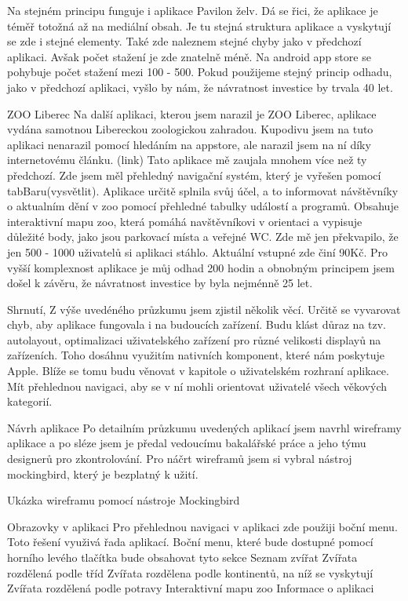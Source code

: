 \documentclass[thesis=B,czech]{FITthesis}[2012/06/26]
\begin{document}
Na stejném principu funguje i aplikace Pavilon želv. Dá se řici, že aplikace je téměř totožná až na mediální obsah. Je tu stejná struktura aplikace a vyskytují se zde i stejné elementy. Také zde naleznem stejné chyby jako v předchozí aplikaci. Avšak počet stažení je zde znatelně méně. Na android app store se pohybuje počet stažení mezi 100 - 500. Pokud použijeme stejný princip odhadu, jako v předchozí aplikaci, vyšlo by nám, že návratnost investice by trvala 40 let.

ZOO Liberec
Na další aplikaci, kterou jsem narazil je ZOO Liberec, aplikace vydána samotnou Libereckou zoologickou zahradou. Kupodivu jsem na tuto aplikaci nenarazil pomocí hledáním na appstore, ale narazil jsem na ní díky internetovému článku. (link)
Tato aplikace mě zaujala mnohem více než ty předchozí. Zde jsem měl přehledný navigační systém, který je vyřešen pomocí tabBaru(vysvětlit). Aplikace určitě splnila svůj účel, a to informovat návštěvníky o aktualním dění v zoo pomocí přehledné tabulky událostí a programů. Obsahuje interaktivní mapu zoo, která pomáhá navštěvníkovi v orientaci a vypisuje důležité body, jako jsou parkovací místa a veřejné WC.
Zde mě jen překvapilo, že jen 500 - 1000 uživatelů si aplikaci stáhlo. Aktuální vstupné zde činí 90Kč. Pro vyšší komplexnost aplikace je můj odhad 200 hodin a obnobným principem jsem došel k závěru, že návratnost investice by byla nejménně 25 let. 



Shrnutí,
Z výše uvedéného průzkumu jsem zjistil několik věcí. Určitě se vyvarovat chyb, aby aplikace fungovala i na budoucích zařízení. Budu klást důraz na tzv. autolayout, optimalizaci uživatelského zařízení pro různé velikosti displayů na zařízeních. Toho dosáhnu využitím nativních komponent, které nám poskytuje Apple. Blíže se tomu budu věnovat v kapitole o uživatelském rozhraní aplikace. Mít přehlednou navigaci, aby se v ní mohli orientovat uživatelé všech věkových kategorií.

Návrh aplikace 
Po detailním průzkumu uvedených aplikací jsem navrhl wireframy aplikace a po sléze jsem je předal vedoucímu bakalářské práce a jeho týmu designerů pro zkontrolování. Pro náčrt wireframů jsem si vybral nástroj mockingbird, který je bezplatný k užití.

Ukázka wireframu pomocí nástroje Mockingbird

Obrazovky v aplikaci
Pro přehlednou navigaci v aplikaci zde použiji boční menu. Toto řešení využivá řada aplikací. Boční menu, které bude dostupné pomocí horního levého tlačítka bude obsahovat tyto sekce
Seznam zvířat
Zvířata rozdělená podle tříd
Zvířata rozdělena podle kontinentů, na níž se vyskytují
Zvířata rozdělená podle potravy
Interaktivní mapu zoo
Informace o aplikaci
\end{document}
